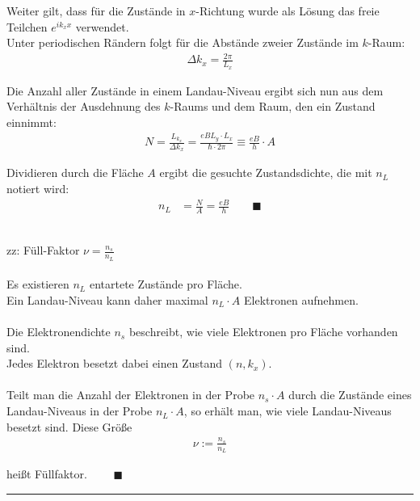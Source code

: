 \documentclass{article}
\begin{document}
{	Weiter gilt, dass für die Zustände in $x$-Richtung wurde als Lösung das freie Teilchen $e^{i k_x x}$ verwendet.\\
	Unter periodischen Rändern folgt für die Abstände zweier Zustände im $k$-Raum:
		\begin{align*}
			\Delta k_x = \frac{2\pi}{L_x}
		\end{align*}
	
	Die Anzahl aller Zustände in einem Landau-Niveau ergibt sich nun aus dem Verhältnis der Ausdehnung des $k$-Raums und dem Raum, den ein Zustand einnimmt:
		\begin{align*}
			N = \frac{L_{k_x}}{\Delta k_x} = \frac{e B L_y \cdot L_x}{\hbar \cdot 2\pi} \equiv \frac{eB}{h} \cdot A
		\end{align*}
	
	Dividieren durch die Fläche $A$ ergibt die gesuchte Zustandsdichte, die mit $n_L$ notiert wird:
		\begin{align*}
			n_L &= \frac{N}{A} = \frac{eB}{h} \qquad \blacksquare
		\end{align*}
	
	
	
	
	
	
	\\
	zz: Füll-Faktor $\nu = \frac{n_s}{n_L}$ \\
	\\
	Es existieren $n_L$ entartete Zustände pro Fläche.\\
	Ein Landau-Niveau kann daher maximal $n_L \cdot A$ Elektronen aufnehmen.\\
	\\
	Die Elektronendichte $n_s$ beschreibt, wie viele Elektronen pro Fläche vorhanden sind.\\
	Jedes Elektron besetzt dabei einen Zustand $(n,k_x)$.\\
\\
	Teilt man die Anzahl der Elektronen in der Probe $n_s \cdot A$ durch die Zustände eines Landau-Niveaus in der Probe $n_L \cdot A$, so erhält man, wie viele Landau-Niveaus besetzt sind. Diese Größe
		\begin{align*}
			\nu := \frac{n_s}{n_L}
		\end{align*}
	
	heißt Füllfaktor. $\qquad \blacksquare$
\hrule
}


\newpage
\end{document}
